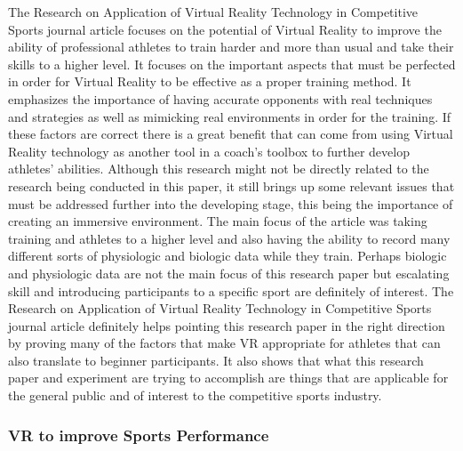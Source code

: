 \documentclass{sigchi}
\begin{document}
The Research on Application of Virtual Reality Technology in Competitive Sports journal article\cite{sanz_franck_lecuyer_anatole_ferran_2015} focuses on the potential of Virtual Reality to improve the ability of professional athletes to train harder and more than usual and take their skills to a higher level. It focuses on the important aspects that must be perfected in order for Virtual Reality to be effective as a proper training method. It emphasizes the importance of having accurate opponents with real techniques and strategies as well as mimicking real environments in order for the training. If these factors are correct there is a great benefit that can come from using Virtual Reality technology as another tool in a coach’s toolbox to further develop athletes’ abilities. Although this research might not be directly related to the research being conducted in this paper, it still brings up some relevant issues that must be addressed further into the developing stage, this being the importance of creating an immersive environment. The main focus of the article was taking training and athletes to a higher level and also having the ability to record many different sorts of physiologic and biologic data while they train. Perhaps biologic and physiologic data are not the main focus of this research paper but escalating skill and introducing participants to a specific sport are definitely of interest. The Research on Application of Virtual Reality Technology in Competitive Sports journal article definitely helps pointing this research paper in the right direction by proving many of the factors that make VR appropriate for athletes that can also translate to beginner participants. It also shows that what this research paper and experiment are trying to accomplish are things that are applicable for the general public and of interest to the competitive sports industry.

\subsubsection{VR to improve Sports Performance}
\end{document}
